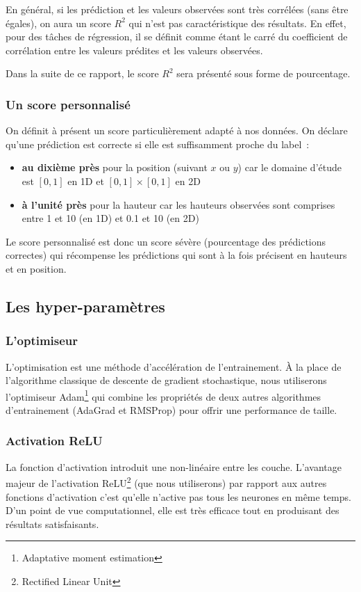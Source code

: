 En général, si les prédiction et les valeurs observées sont très corrélées (sans être égales), on aura un score $R^2$ qui n'est pas caractéristique des résultats. En effet, pour des tâches de régression, il se définit comme étant le carré du coefficient de corrélation entre les valeurs prédites et les valeurs observées.

Dans la suite de ce rapport, le score $R^2$ sera présenté sous forme de pourcentage. 

\subsubsection{Un score personnalisé}
On définit à présent un score particulièrement adapté à nos données. On déclare qu'une prédiction est correcte si elle est suffisamment proche du label :
\begin{itemize}
 \item \textbf{au dixième près} pour la position (suivant $x$ ou $y$) car le domaine d'étude est $[0,1]$ en 1D et $[0,1] \times [0,1]$ en 2D
 \item \textbf{à l'unité près} pour la hauteur car les hauteurs observées sont comprises entre 1 et 10 (en 1D) et 0.1 et 10 (en 2D) 
\end{itemize}

Le score personnalisé est donc un score sévère (pourcentage des prédictions correctes) qui récompense les prédictions qui sont à la fois précisent en hauteurs et en position.


\subsection{Les hyper-paramètres}

\subsubsection{L'optimiseur}
L'optimisation est une méthode d'accélération de l'entrainement. À la place de l'algorithme classique de descente de gradient stochastique, nous utiliserons l'optimiseur Adam\footnote{Adaptative moment estimation} qui combine les propriétés de deux autres algorithmes d'entrainement (AdaGrad et RMSProp) pour offrir une performance de taille.

\subsubsection{Activation ReLU}
La fonction d'activation introduit une non-linéaire entre les couche. L'avantage majeur de l'activation ReLU\footnote{Rectified Linear Unit} (que nous utiliserons) par rapport aux autres fonctions d'activation c'est qu'elle n'active pas tous les neurones en même temps. D'un point de vue computationnel, elle est très efficace tout en produisant des résultats satisfaisants.

